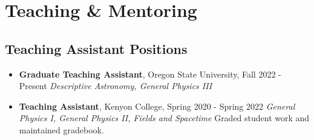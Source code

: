 \documentclass[11pt,letterpaper,sans,unicode]{moderncv}
\newcommand{\blucirc}{{\color{color1} $\circ\;\;$}}
\begin{document}
{%
%


\begin{etaremune}[leftmargin=8mm]

\end{etaremune}


%

\section{Teaching \& Mentoring}

\subsection{Teaching Assistant Positions}
	\renewcommand\labelitemi{\blucirc}
	\begin{itemize}[leftmargin=8mm]
	\setlength\itemsep{1mm}
	\item \textbf{\color{color1} Graduate Teaching Assistant}, Oregon State University, \hfill Fall 2022 - Present
        		\newline  \textit{Descriptive Astronomy, General Physics III }
	\item \textbf{\color{color1} Teaching Assistant}, Kenyon College, \hfill Spring 2020 - Spring 2022
        		\newline  \textit{General Physics I, General Physics II, Fields and Spacetime}
			\newline Graded student work and maintained gradebook.
	\end{itemize}


}
\end{document}
